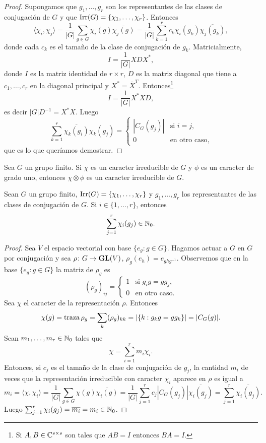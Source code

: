 \begin{proof}
  Supongamos que $g_1,\dots,g_r$ son los representantes de las clases de
  conjugación de $G$ y que $\operatorname{Irr}(G)=\{\chi_1,\dots,\chi_r\}$. Entonces
  \[
    \langle\chi_i,\chi_j\rangle
    =\frac{1}{|G|}\sum_{g\in G}\chi_i(g)\overline{\chi_j(g)}
    =\frac{1}{|G|}\sum_{k=1}^rc_k\chi_i(g_k)\overline{\chi_j(g_k)},
  \]
  donde cada $c_k$ es el tamaño de la clase de conjugación de $g_k$. Matricialmente,
  \[
    I=\frac{1}{|G|}XD X^*,
  \]
  donde $I$ es la matriz identidad de $r\times r$, $D$ es la matriz diagonal
  que tiene a $c_1,\dots,c_r$ en la diagonal principal y
  $X^*=\overline{X}^T$. Entonces\footnote{Si $A,B\in\mathbb{C}^{s\times s}$ son tales que  
  $AB=I$ entonces $BA=I$.}
  \[
	I=\frac{1}{|G|}X^*XD,
  \]
  es decir $|G|D^{-1}=X^*X$. Luego 
  \[
    \sum_{k=1}^r\overline{\chi_k(g_i)}\chi_k(g_j)=\begin{cases}
    |C_G(g_j)| & \text{si $i=j$},\\
    0 & \text{en otro caso},
    \end{cases}
  \]
  que es lo que queríamos demostrar.
\end{proof}

\begin{exercise}
Sea $G$ un grupo finito. Si $\chi$ es un caracter irreducible de $G$ y $\phi$ es un caracter de grado uno, entonces
$\chi\otimes\phi$ es un caracter irreducible de $G$. 
\end{exercise}

\begin{theorem}[Solomon]
  \label{theorem:Solomon}
  Sean $G$ un grupo finito, $\operatorname{Irr}(G)=\{\chi_1,\dots,\chi_r\}$ y $g_1,\dots,g_r$ los 
  representantes de las clases de conjugación de $G$. 
  Si $i\in\{1,\dots,r\}$, entonces 
  \[
	  \sum_{j=1}^r\chi_i(g_j)\in\mathbb{N}_0.
  \]
\end{theorem}

\begin{proof}
  Sea $V$ el espacio vectorial con base $\{e_g:g\in G\}$.  Hagamos actuar a $G$
  en $G$ por conjugación y sea $\rho\colon G\to\mathbf{GL}(V)$,
  $\rho_g(e_h)=e_{ghg^{-1}}$.  Observemos que en la base $\{e_g:g\in G\}$ la
  matriz de $\rho_g$ es
  \[
   (\rho_g)_{ij}=\begin{cases} 
    1 & \text{si $g_ig=gg_j$},\\
    0 & \text{en otro caso}.
  \end{cases}
  \]
  Sea $\chi$ el caracter de la
  representación $\rho$. Entonces 
  \[
    \chi(g)=\operatorname{traza}\rho_g=\sum_{k}(\rho_g)_{kk}=|\{k:g_kg=gg_k\}|=|C_G(g)|.
  \]
  Sean $m_1,\dots,m_r\in\mathbb{N}_0$ tales que 
  \[
	\chi=\sum_{i=1}^rm_i\chi_i.
  \]
  Entonces, si $c_j$ es el tamaño de la clase de conjugación de $g_j$, la
  cantidad $m_i$ de veces que la representación irreducible con caracter
  $\chi_i$ aparece en $\rho$ es igual a 
  \[
	  m_i=\langle\chi,\chi_i\rangle=\frac{1}{|G|}\sum_{g\in G}\chi(g)\overline{\chi_i(g)}
	  =\frac{1}{|G|}\sum_{j=1}^rc_j|C_G(g_j)|\overline{\chi_i(g_j)}
	  =\sum_{j=1}^r\overline{\chi_i(g_j)}.
  \]
  Luego $\sum_{j=1}^r\chi_i(g_j)=\overline{m_i}=m_i\in\mathbb{N}_0$.
\end{proof}

